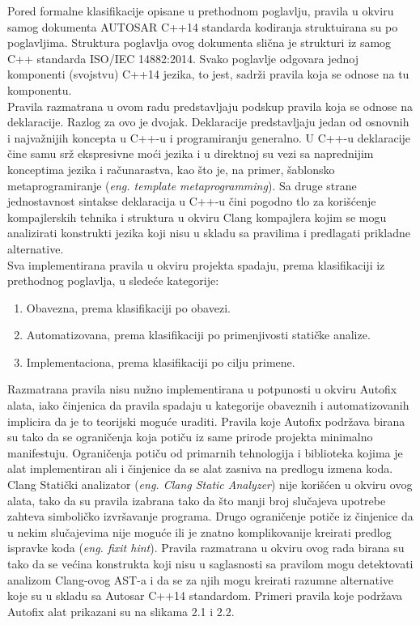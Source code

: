 \documentclass[12pt,oneside]{memoir}
\begin{document}
Pored formalne klasifikacije opisane u prethodnom poglavlju, pravila u okviru samog dokumenta AUTOSAR C++14 standarda kodiranja struktuirana su po poglavljima.
Struktura poglavlja ovog dokumenta slična je strukturi iz samog C++ standarda ISO/IEC 14882:2014. Svako poglavlje odgovara jednoj komponenti (svojstvu) C++14 jezika, to jest, sadrži pravila koja se odnose na tu komponentu.
\\
\indent
Pravila razmatrana u ovom radu predstavljaju podskup pravila koja se odnose na deklaracije. Razlog za ovo je dvojak. Deklaracije predstavljaju jedan
od osnovnih i najvažnijih koncepta u C++-u i programiranju generalno. U C++-u deklaracije čine samu srž ekspresivne moći jezika i u direktnoj su vezi
sa naprednijim konceptima jezika i računarastva, kao što je, na primer, šablonsko metaprogramiranje (\textit{eng. template metaprogramming}).
Sa druge strane jednostavnost sintakse deklaracija u C++-u čini pogodno tlo za korišćenje kompajlerskih tehnika i struktura u okviru Clang kompajlera kojim se mogu analizirati konstrukti jezika koji nisu u skladu sa pravilima i predlagati prikladne alternative.
\\
\indent
Sva implementirana pravila u okviru projekta spadaju, prema klasifikaciji iz prethodnog poglavlja, u sledeće kategorije:
\begin{enumerate}
  \item{Obavezna, prema klasifikaciji po obavezi.}
  \item{Automatizovana, prema klasifikaciji po primenjivosti statičke analize.}
  \item{Implementaciona, prema klasifikaciji po cilju primene.}
\end{enumerate}

Razmatrana pravila nisu nužno implementirana u potpunosti u okviru Autofix alata, iako činjenica da pravila spadaju u kategorije obaveznih i automatizovanih
implicira da je to teorijski moguće uraditi. Pravila koje Autofix podržava birana su tako da se ograničenja koja potiču iz same prirode projekta minimalno manifestuju. Ograničenja potiču od primarnih tehnologija i biblioteka kojima je alat implementiran ali i činjenice da se alat zasniva na predlogu izmena koda. 
Clang Statički analizator (\textit{eng. Clang Static Analyzer}) nije korišćen u okviru ovog alata, tako da su pravila izabrana tako da što manji broj slučajeva upotrebe zahteva simboličko izvršavanje programa. Drugo ograničenje potiče iz činjenice da u nekim slučajevima nije moguće ili je znatno komplikovanije kreirati predlog ispravke koda (\textit{eng. fixit hint}). Pravila razmatrana u okviru ovog rada birana su tako da se većina konstrukta koji nisu u saglasnosti sa pravilom mogu detektovati analizom Clang-ovog AST-a i da se za njih mogu kreirati razumne alternative koje su u skladu sa Autosar C++14 standardom.
Primeri pravila koje podržava Autofix alat prikazani su na slikama 2.1 i 2.2.
\end{document}
